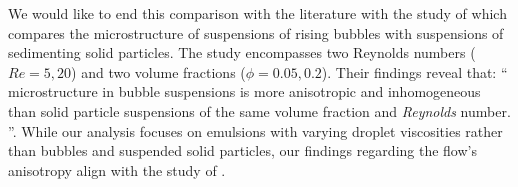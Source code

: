 We would like to end this comparison with the literature with the study of \citet{yin2008lattice} which compares the microstructure of suspensions of rising bubbles with suspensions of sedimenting solid particles.
The study encompasses two Reynolds numbers ($Re = 5, 20$) and two volume fractions ($\phi = 0.05, 0.2$). Their findings reveal that: 
\enquote{    
     microstructure in bubble
    suspensions is more anisotropic and inhomogeneous than
    solid particle suspensions of the same volume fraction and
    \textit{Reynolds} number.    
}. 
While our analysis focuses on emulsions with varying droplet viscosities rather than bubbles and suspended solid particles, our findings regarding the flow's anisotropy align with the study of \citet{yin2008lattice}. 



